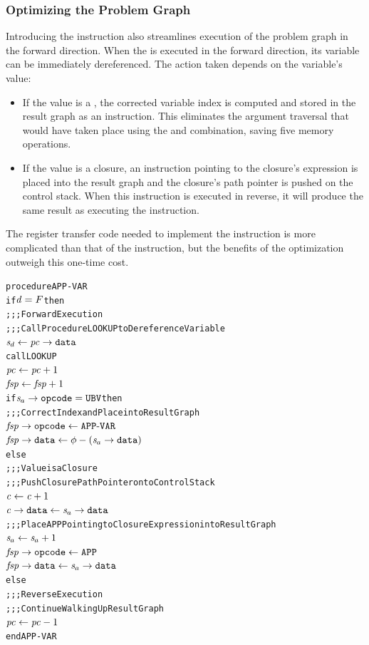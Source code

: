 \subsubsection*{Optimizing the Problem Graph}

Introducing the  instruction also streamlines execution of the
problem graph in the forward direction. When the  is executed in the
forward direction, its variable can be immediately dereferenced. The action taken
depends on the variable's value:

\begin{itemize}
\item If the value is a , the corrected variable index is computed and stored
in the result graph as an  instruction. This eliminates the argument
traversal that would have taken place using the  and 
combination, saving five memory operations.

\item If the value is a closure, an  instruction pointing to the closure's
expression is placed into the result graph and the closure's path pointer is pushed
on the control stack. When this  instruction is executed in reverse, it
will produce the same result as executing the  instruction.
\end{itemize}

The register transfer code needed to implement the  instruction is
more complicated than that of the  instruction, but the benefits of the
optimization outweigh this one-time cost.


\par\smallskip\noindent\begin{minipage}{\linewidth}
\begin{alltt}
procedure APP-VAR
  if \(\rt{d} = F\) then
    \textrm{;;; Forward Execution}
    \textrm{;;; Call Procedure LOOKUP to Dereference Variable}
    \(\rtsd \leftarrow \rtfield{pc}{data}\)
    call LOOKUP
    \(\rt{pc} \leftarrow \rt{pc}+1\)
    \(\rt{fsp} \leftarrow \rt{fsp}+1\)
    if \(\rtsa\rightarrow\mathtt{opcode} = \mathtt{UBV}\) then
      \textrm{;;; Correct Index and Place into Result Graph}
      \(\rtfield{fsp}{opcode} \leftarrow \mathtt{APP}\textrm{-}\mathtt{VAR}\)
      \(\rtfield{fsp}{data} \leftarrow \phi-(\rtsa\rightarrow\mathtt{data})\)
    else
      \textrm{;;; Value is a Closure}
      \textrm{;;; Push Closure Path Pointer onto Control Stack}
      \(\rt{c} \leftarrow \rt{c}+1\)
      \(\rtfield{c}{data} \leftarrow \rtsa\rightarrow\mathtt{data}\)
      \textrm{;;; Place APP Pointing to Closure Expression into Result Graph}
      \(\rtsa \leftarrow \rtsa+1\)
      \(\rtfield{fsp}{opcode} \leftarrow \mathtt{APP}\)
      \(\rtfield{fsp}{data} \leftarrow \rtsa\rightarrow\mathtt{data}\)
  else
    \textrm{;;; Reverse Execution}
    \textrm{;;; Continue Walking Up Result Graph}
    \(\rt{pc} \leftarrow \rt{pc}-1\)
end APP-VAR
\end{alltt}
\end{minipage}\par\smallskip


